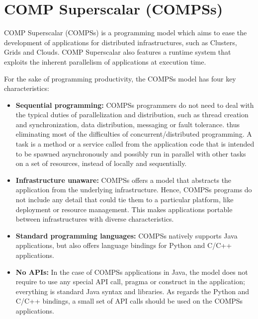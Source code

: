 \section{COMP Superscalar (COMPSs)}
\label{sec:Introduction}

COMP Superscalar (COMPSs) is a programming model which aims to ease the 
development of applications for distributed infrastructures, such as Clusters, 
Grids and Clouds. COMP Superscalar also features a runtime system that exploits 
the inherent parallelism of applications at execution time.

For the sake of programming productivity, the COMPSs model has four key 
characteristics:

\begin{itemize}
 
 \item  {\bf Sequential programming:} COMPSs programmers do not need to deal 
 with the typical duties of parallelization and distribution, such as thread 
 creation and synchronization, data distribution, messaging or fault tolerance. 
 thus eliminating most of the difficulties of concurrent/distributed programming.
 A task is a method or a service called from the application code that is intended to be spawned asynchronously and possibly run in parallel with other tasks on a set of resources, instead of locally and sequentially.
 
 \item  {\bf Infrastructure unaware:} COMPSs offers a model that abstracts the 
 application from the underlying infrastructure. Hence, COMPSs 
 programs do not include any detail that could tie them to a particular 
 platform, like deployment or resource management. This makes applications 
 portable between infrastructures with diverse characteristics.
 
 \item  {\bf Standard programming languages:} COMPSs natively supports Java applications, but also offers language bindings for Python and 
 C/C++ applications. 
 
 \item  {\bf No APIs:} In the case of COMPSs applications in Java, the model 
 does not require to use any special API call, pragma or construct in the 
 application; everything is standard Java syntax and libraries. As 
 regards the Python and C/C++ bindings, a small set of API calls should be used 
 on the COMPSs applications.

\end{itemize}

